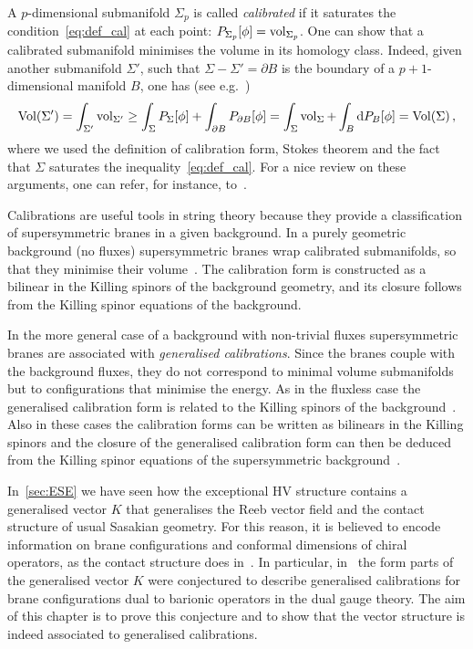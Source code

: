 \documentclass[debug]{phd}
\begin{document}
			A $p$-dimensional submanifold $\Sigma_p$ is called \emph{calibrated} if it saturates the condition~\eqref{eq:def_cal} at each point: $P_{\Sigma_p} [\phi] = \operatorname{vol}_{\Sigma_p}$. 
			One can show that a calibrated submanifold minimises the volume in its homology class. 
			Indeed, given another submanifold $\Sigma'$, such that $\Sigma - \Sigma' =\partial B$ is the boundary of a $p+1$-dimensional manifold $B$, one has (see e.g.~\cite{Cal_Geo})
%
	\begin{equation*}
		\mathrm{Vol}\left( \Sigma' \right) = \int_{\Sigma'} \vol_{\Sigma'} \geq \int_{\Sigma} P_{\Sigma}[ \phi] + \int_{\partial B} P_{\partial B}[\phi] 
			= \int_{\Sigma} \vol_{\Sigma} + \int_{B} \dd  P_B[ \phi] = \mathrm{Vol} \left( \Sigma\right)\, , 
	\end{equation*}
%
where we used the definition of calibration form, Stokes theorem and the fact that $\Sigma$ saturates the inequality~\eqref{eq:def_cal}.
For a nice review on these arguments, one can refer, for instance, to~\cite{Joyce:2001nm}. 

Calibrations are useful tools in string theory because they provide a classification of supersymmetric branes in a given background. 
In a purely geometric background (no fluxes) supersymmetric branes wrap calibrated submanifolds, so that they minimise their volume~\cite{Becker:1995kb, Becker:1996ay, Gibbons:1998hm, Gauntlett:1998vk}. 
The calibration form is constructed as a bilinear in the Killing spinors of the background geometry, and its closure follows from the Killing spinor equations of the background. 

In the more general case of a background with non-trivial fluxes supersymmetric branes are associated with \emph{generalised calibrations}. 
Since the branes couple with the background fluxes, they do not correspond to minimal volume submanifolds but to configurations that minimise the energy. 
As in the fluxless case the generalised calibration form is related to the Killing spinors of the background~\cite{Gutowski:1999iu, Gutowski:1999tu, Townsend:1999nf, Gauntlett:2001ur, Gauntlett:2002sc, Gauntlett:2003cy, MS03, Cascales:2004qp, HPS03, HPS04}. 
Also in these cases the calibration forms can be written as bilinears in the Killing spinors and the closure of the generalised calibration form can then be deduced from the Killing spinor equations of the supersymmetric background~\cite{Cascales:2004qp, Gutowski:1999tu, Martucci:2005ht, MS03}.

In~\cref{sec:ESE} we have seen how the exceptional HV structure contains a generalised vector $K$ that generalises the Reeb vector field and the contact structure of usual Sasakian geometry.
For this reason, it is believed to encode information on brane configurations and conformal dimensions of chiral operators, as the contact structure does in~\cite{Martelli:2006yb}. 
In particular, in~\cite{AshmoreESE} the form parts of the generalised vector $K$ were conjectured to describe generalised calibrations for brane configurations dual to barionic operators in the dual gauge theory.
The aim of this chapter is to prove this conjecture and to show that the vector structure is indeed associated to generalised calibrations.
\end{document}
